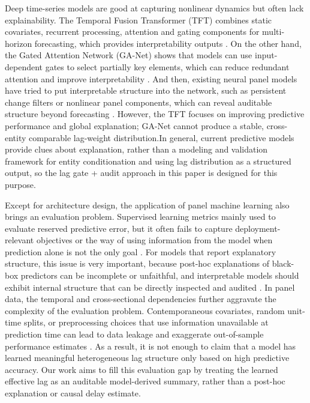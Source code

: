 \documentclass[conference]{IEEEtran}
\begin{document}
Deep time-series models are good at capturing nonlinear dynamics but often lack explainability. The Temporal Fusion Transformer (TFT) combines static covariates, recurrent processing, attention and gating components for multi-horizon forecasting, which provides interpretability outputs \cite{lim2021tft}. On the other hand, the Gated Attention Network (GA-Net) shows that models can use input-dependent gates to select partially key elements, which can reduce redundant attention and improve interpretability \cite{xue2020gated}. And then, existing neural panel models have tried to put interpretable structure into the network, such as persistent change filters or nonlinear panel components, which can reveal auditable structure beyond forecasting \cite{yang2020panelnn,chronopoulos2023dnnpanel}. However, the TFT focuses on improving predictive performance and global explanation; GA-Net cannot produce a stable, cross-entity comparable lag-weight distribution.In general, current predictive models provide clues about explanation, rather than a modeling and validation framework for entity conditionation and using lag distribution as a structured output, so the lag gate + audit approach in this paper is designed for this purpose.

 
 
Except for architecture design, the application of panel machine learning also brings an evaluation problem. Supervised learning metrics mainly used to evaluate reserved predictive error, but it often fails to capture deployment-relevant objectives or the way of using information from the model when prediction alone is not the only goal \cite{lipton2018mythos}. For models that report explanatory structure, this issue is very important, because post-hoc explanations of black-box predictors can be incomplete or unfaithful, and interpretable models should exhibit internal structure that can be directly inspected and audited \cite{rudin2019stop}. In panel data, the temporal and cross-sectional dependencies further aggravate the complexity of the evaluation problem. Contemporaneous covariates, random unit-time splits, or preprocessing choices that use information unavailable at prediction time can lead to data leakage and exaggerate out-of-sample performance estimates \cite{cerqua2025mlpanel}. As a result, it is not enough to claim that a model has learned meaningful heterogeneous lag structure only based on high predictive accuracy. Our work aims to fill this evaluation gap by treating the learned effective lag as an auditable model-derived summary, rather than a post-hoc explanation or causal delay estimate.
\end{document}
